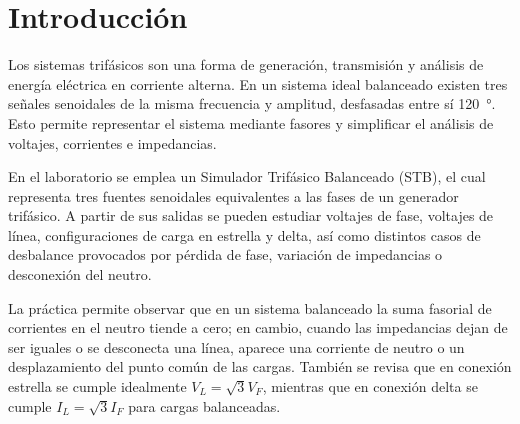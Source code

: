 
\section{Introducción}
Los sistemas trifásicos son una forma de generación, transmisión y análisis de energía eléctrica en corriente alterna. En un sistema ideal balanceado existen tres señales senoidales de la misma frecuencia y amplitud, desfasadas entre sí \SI{120}{\degree}. Esto permite representar el sistema mediante fasores y simplificar el análisis de voltajes, corrientes e impedancias.

En el laboratorio se emplea un Simulador Trifásico Balanceado (STB), el cual representa tres fuentes senoidales equivalentes a las fases de un generador trifásico. A partir de sus salidas se pueden estudiar voltajes de fase, voltajes de línea, configuraciones de carga en estrella y delta, así como distintos casos de desbalance provocados por pérdida de fase, variación de impedancias o desconexión del neutro.

La práctica permite observar que en un sistema balanceado la suma fasorial de corrientes en el neutro tiende a cero; en cambio, cuando las impedancias dejan de ser iguales o se desconecta una línea, aparece una corriente de neutro o un desplazamiento del punto común de las cargas. También se revisa que en conexión estrella se cumple idealmente $V_L=\sqrt{3}V_F$, mientras que en conexión delta se cumple $I_L=\sqrt{3}I_F$ para cargas balanceadas.